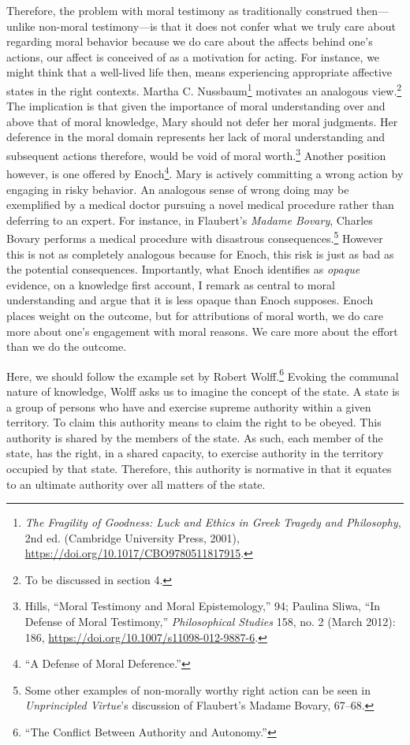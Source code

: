 \documentclass[phdthesis,12pt,final]{wuthesis}
\theoremstyle{definition}
\theoremstyle{definition}
\theoremstyle{definition}
\theoremstyle{definition}
\theoremstyle{remark}
\begin{document}
Therefore, the problem with moral testimony as traditionally construed then---unlike non-moral testimony---is that it does not confer what we truly care about regarding moral behavior because we do care about the affects behind one's actions, our affect is conceived of as a motivation for acting. For instance, we might think that a well-lived life then, means experiencing appropriate affective states in the right contexts. Martha C. Nussbaum\footnote{\emph{The {Fragility} of {Goodness}: {Luck} and {Ethics} in {Greek Tragedy} and {Philosophy}}, 2nd ed. (Cambridge University Press, 2001), \url{https://doi.org/10.1017/CBO9780511817915}.} motivates an analogous view.\footnote{To be discussed in section 4.} The implication is that given the importance of moral understanding over and above that of moral knowledge, Mary should not defer her moral judgments. Her deference in the moral domain represents her lack of moral understanding and subsequent actions therefore, would be void of moral worth.\footnote{Hills, {``Moral Testimony and Moral Epistemology,''} 94; Paulina Sliwa, {``In Defense of Moral Testimony,''} \emph{Philosophical Studies} 158, no. 2 (March 2012): 186, \url{https://doi.org/10.1007/s11098-012-9887-6}.} Another position however, is one offered by Enoch\footnote{{``A {Defense} of {Moral Deference}.''}}. Mary is actively committing a wrong action by engaging in risky behavior. An analogous sense of wrong doing may be exemplified by a medical doctor pursuing a novel medical procedure rather than deferring to an expert. For instance, in Flaubert's \emph{Madame Bovary}, Charles Bovary performs a medical procedure with disastrous consequences.\footnote{ Some other examples of non-morally worthy right action can be seen in \emph{Unprincipled {Virtue}}'s discussion of Flaubert's Madame Bovary, 67--68.} However this is not as completely analogous because for Enoch, this risk is just as bad as the potential consequences. Importantly, what Enoch identifies as \emph{opaque} evidence, on a knowledge first account, I remark as central to moral understanding and argue that it is less opaque than Enoch supposes. Enoch places weight on the outcome, but for attributions of moral worth, we do care more about one's engagement with moral reasons. We care more about the effort than we do the outcome.

Here, we should follow the example set by Robert Wolff.\footnote{{``The {Conflict Between Authority} and {Autonomy}.''}} Evoking the communal nature of knowledge, Wolff asks us to imagine the concept of the state. A state is a group of persons who have and exercise supreme authority within a given territory. To claim this authority means to claim the right to be obeyed. This authority is shared by the members of the state. As such, each member of the state, has the right, in a shared capacity, to exercise authority in the territory occupied by that state. Therefore, this authority is normative in that it equates to an ultimate authority over all matters of the state.
\end{document}
